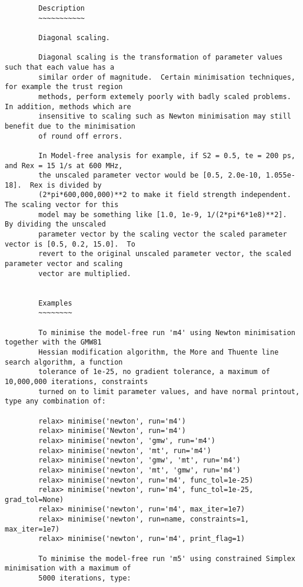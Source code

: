 \begin{verbatim}
        Description
        ~~~~~~~~~~~

        Diagonal scaling.

        Diagonal scaling is the transformation of parameter values such that each value has a
        similar order of magnitude.  Certain minimisation techniques, for example the trust region
        methods, perform extemely poorly with badly scaled problems.  In addition, methods which are
        insensitive to scaling such as Newton minimisation may still benefit due to the minimisation
        of round off errors.

        In Model-free analysis for example, if S2 = 0.5, te = 200 ps, and Rex = 15 1/s at 600 MHz,
        the unscaled parameter vector would be [0.5, 2.0e-10, 1.055e-18].  Rex is divided by
        (2*pi*600,000,000)**2 to make it field strength independent.  The scaling vector for this
        model may be something like [1.0, 1e-9, 1/(2*pi*6*1e8)**2].  By dividing the unscaled
        parameter vector by the scaling vector the scaled parameter vector is [0.5, 0.2, 15.0].  To
        revert to the original unscaled parameter vector, the scaled parameter vector and scaling
        vector are multiplied.


        Examples
        ~~~~~~~~

        To minimise the model-free run 'm4' using Newton minimisation together with the GMW81
        Hessian modification algorithm, the More and Thuente line search algorithm, a function
        tolerance of 1e-25, no gradient tolerance, a maximum of 10,000,000 iterations, constraints
        turned on to limit parameter values, and have normal printout, type any combination of:

        relax> minimise('newton', run='m4')
        relax> minimise('Newton', run='m4')
        relax> minimise('newton', 'gmw', run='m4')
        relax> minimise('newton', 'mt', run='m4')
        relax> minimise('newton', 'gmw', 'mt', run='m4')
        relax> minimise('newton', 'mt', 'gmw', run='m4')
        relax> minimise('newton', run='m4', func_tol=1e-25)
        relax> minimise('newton', run='m4', func_tol=1e-25, grad_tol=None)
        relax> minimise('newton', run='m4', max_iter=1e7)
        relax> minimise('newton', run=name, constraints=1, max_iter=1e7)
        relax> minimise('newton', run='m4', print_flag=1)

        To minimise the model-free run 'm5' using constrained Simplex minimisation with a maximum of
        5000 iterations, type:


\end{verbatim}
